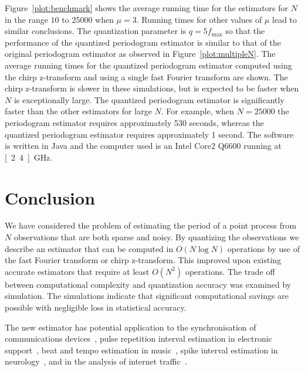 \documentclass[10pt,twocolumn,twoside]{IEEEtran}
\begin{document}
Figure~\ref{plot:benchmark} shows the average running time for the estimators for $N$ in the range $10$ to $25000$ when $\mu=3$.  Running times for other values of $\mu$ lead to similar conclusions.  The quantization parameter is $q = 5 f_{\text{max}}$ so that the performance of the quantized periodogram estimator is similar to that of the original periodogram estimator as observed in Figure~\ref{plot:multipleN}.  The average running times for the quantized periodogram estimator computed using the chirp z-transform and using a single fast Fourier transform are shown.  The chirp z-transform is slower in these simulations, but is expected to be faster when $N$ is exceptionally large.  %
The quantized periodogram estimator is significantly faster than the other estimators for large $N$.  For example, when $N = 25000$ the periodogram estimator requires approximately 530 seconds, whereas the quantized periodogram estimator requires approximately 1 second.  The software is written in Java and the computer used is an Intel Core2 Q6600 running at \unit[2.4]{GHz}. 

 

\section{Conclusion}

We have considered the problem of estimating the period of a point process from $N$ observations that are both sparse and noisy.  By quantizing the observations we describe an estimator that can be computed in $O(N\log N)$ operations by use of the fast Fourier transform or chirp z-transform.  This improved upon existing accurate estimators that require at least $O(N^2)$ operations.  The trade off between computational complexity and quantization accuracy was examined by simulation.  The simulations indicate that significant computational savings are possible with negligible loss in statistical accuracy.

The new estimator has potential application to the synchronisation of communications devices~\cite{Fogel1988,Fogel1989_bit_synch_zero_crossings}, pulse repetition interval estimation in electronic support~\cite{EltonGray_puilse_train_rader_1994,Gray_more_pri_1994,Clarkson_thesis,clarkson_estimate_period_pulse_train_1996,Hauochan_pri_2012}, beat and tempo estimation in music~\cite{dixon_beat_extraction_2001}, spike interval estimation in neurology~\cite{Arnett_neuro_pri_1976,Brillinger_spike_trains_1988,Rossoni200630}, and in the analysis of internet traffic~\cite{He_detecting_periodic_patterns_in_internet_2006,5585849,5947313}.


\small

\end{document}
